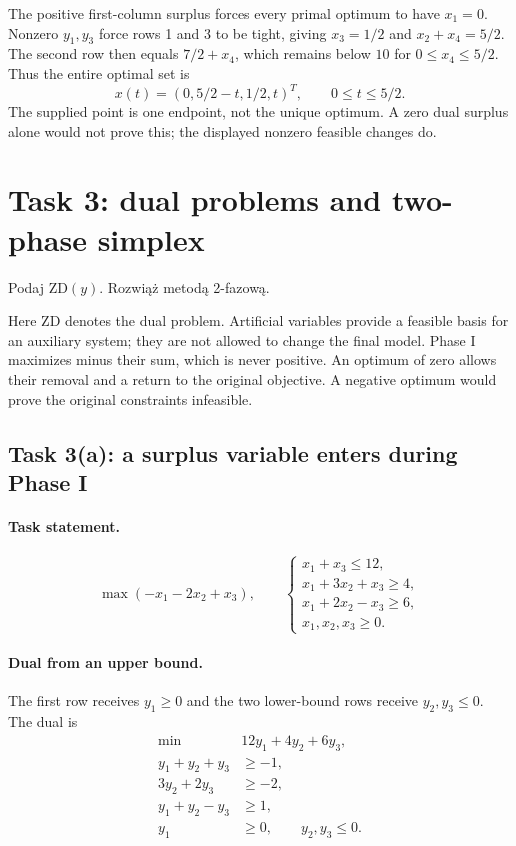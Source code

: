 \documentclass[11pt,a4paper]{article}
\begin{document}
The positive first-column surplus forces every primal optimum to have
$x_1=0$. Nonzero $y_1,y_3$ force rows 1 and 3 to be tight, giving
$x_3=1/2$ and $x_2+x_4=5/2$. The second row then equals $7/2+x_4$,
which remains below $10$ for $0\leq x_4\leq5/2$. Thus the entire optimal set is
\[
  x(t)=(0,5/2-t,1/2,t)^T,\qquad 0\leq t\leq5/2.
\]
The supplied point is one endpoint, not the unique optimum. A zero dual
surplus alone would not prove this; the displayed nonzero feasible changes do.

\section{Task 3: dual problems and two-phase simplex}\label{sec:task-three}
\begin{otherlanguage}{polish}
  Podaj ZD$(y)$. Rozwiąż metodą 2-fazową.
\end{otherlanguage}
Here ZD denotes the dual problem. Artificial variables provide a feasible
basis for an auxiliary system; they are not allowed to change the final model.
Phase I maximizes minus their sum, which is never positive. An optimum of
zero allows their removal and a return to the original objective. A negative
optimum would prove the original constraints infeasible.

\subsection{Task 3(a): a surplus variable enters during Phase I}
\paragraph{Task statement.}
\[
  \max(-x_1-2x_2+x_3),\qquad
  \begin{cases}
    x_1+x_3\leq12,     \\
    x_1+3x_2+x_3\geq4, \\
    x_1+2x_2-x_3\geq6, \\
    x_1,x_2,x_3\geq0.
  \end{cases}
\]
\paragraph{Dual from an upper bound.}
The first row receives $y_1\geq0$ and the two lower-bound rows receive
$y_2,y_3\leq0$. The dual is
\[
  \begin{aligned}
    \min\quad&12y_1+4y_2+6y_3,\\
    y_1+y_2+y_3&\geq-1,\\
    3y_2+2y_3&\geq-2,\\
    y_1+y_2-y_3&\geq1,\\
    y_1&\geq0,\qquad y_2,y_3\leq0.
  \end{aligned}
\]
\end{document}
